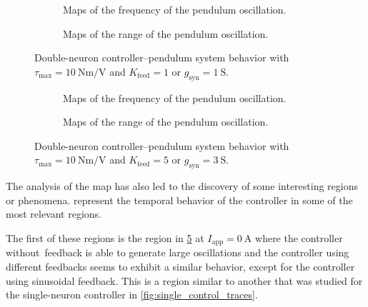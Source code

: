 \begin{figure}[!htbp]
    \centering
    \begin{subfigure}[t][.46\textheight][b]{\textwidth}
        \centering
        \caption{Maps of the frequency of the pendulum oscillation.}
        \label{fig:double_t10_low_freq}
    \end{subfigure}
    
    \begin{subfigure}[b][.46\textheight][t]{\textwidth}
        \centering
        \caption{Maps of the range of the pendulum oscillation.}
        \label{fig:double_t10_low_range}
    \end{subfigure}
    \caption{Double-neuron controller–pendulum system behavior with $\tau_\text{max} = \qty{10}{\newton\meter\per\volt}$ and $K_\text{feed} = 1$ or $g_{\text{syn}} = \qty{1}{\siemens}$.}
    \label{fig:double_t10_low}
\end{figure}

\begin{figure}[!htbp]
    \centering
    \begin{subfigure}[t][.46\textheight][b]{\textwidth}
        \centering
        \caption{Maps of the frequency of the pendulum oscillation.}
        \label{fig:double_t10_high_freq}
    \end{subfigure}
    
    \begin{subfigure}[b][.46\textheight][t]{\textwidth}
        \centering
        \caption{Maps of the range of the pendulum oscillation.}
        \label{fig:double_t10_high_range}
    \end{subfigure}
    \caption{Double-neuron controller–pendulum system behavior with $\tau_\text{max} = \qty{10}{\newton\meter\per\volt}$ and $K_\text{feed} = 5$ or $g_{\text{syn}} = \qty{3}{\siemens}$.}
    \label{fig:double_t10_high}
\end{figure}

The analysis of the map has also led to the discovery of some interesting regions or phenomena.
 represent the temporal behavior of the controller in some of the most relevant regions.

The first of these regions is the region in \cref{fig:double_t10_high_range} at $I_\text{app} = \qty{0}{\ampere}$ where the controller without feedback is able to generate large oscillations and the controller using different feedbacks seems to exhibit a similar behavior, except for the controller using sinusoidal feedback.
This is a region similar to another that was studied for the single-neuron controller in \cref{fig:single_control_traces}. 

